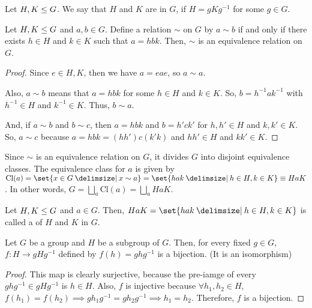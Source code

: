 \documentclass[11pt]{penrose}
\begin{document}
\begin{ndfn}
    Let $H, K \mathrel{\leq} G$. We say that $H$ and $K$ are  in $G$, if $H = g K g^{-1}$ for some $g \in G$.
\end{ndfn}

\begin{nprop}
    Let $H, K \mathrel{\leq} G$ and $a, b \in G$. Define a relation $\sim$ on $G$ by $a \sim b$ if and only if there exists $h \in H$ and $k \in K$ such that $a = hbk$. Then, $\sim$ is an equivalence relation on $G$.
\end{nprop}
\begin{proof}
    Since $e \in H, K$, then we have $a = e a e$, so $a \sim a$.

    Also, $a \sim b$ means that $a = hbk$ for some $h \in H$ and $k \in K$. So, $b = h^{-1} a k^{-1}$ with $h^{-1} \in H$ and $k^{-1} \in K$. Thus, $b \sim a$.

    And, if $a \sim b$ and $b \sim c$, then $a = hbk$ and $b = h'ck'$ for $h, h' \in H$ and $k, k' \in K$. So, $a \sim c$ because $a = h b k = (h h') c (k' k)$ and $hh' \in H$ and $kk' \in K$.
\end{proof}

\begin{remark}
    Since $\sim$ is an equivalence relation on $G$, it divides $G$ into disjoint equivalence classes. The equivalence class for $a$ is given by $\mathrm{Cl}(a) = \set{x \in G \st x \sim a} = \set{hak \st h \in H, k \in K} \equiv HaK$. In other words, $\displaystyle G = \bigsqcup_{a} \mathrm{Cl}(a) = \bigsqcup_{a} HaK$.

\end{remark}

\begin{ndfn}
    Let $H, K \mathrel{\leq} G$ and $a \in G$. Then, $HaK = \set{hak \st h \in H, k \in K}$ is called a  of $H$ and $K$ in $G$.
\end{ndfn}

\begin{nlemma}
    Let $G$ be a group and $H$ be a subgroup of $G$. Then, for every fixed $g \in G$, $f : H \to g H g^{-1}$ defined by $f(h) = ghg^{-1}$ is a bijection. (It is an isomorphism)
\end{nlemma}
\begin{proof}
    This map is clearly surjective, because the pre-iamge of every $ghg^{-1} \in gHg^{-1}$ is $h \in H$. Also, $f$ is injective because $\forall h_{1}, h_{2} \in H$, $f(h_{1}) = f(h_{2}) \implies gh_{1}g^{-1} = gh_{2}g^{-1} \implies h_{1} = h_{2}$. Therefore, $f$ is a bijection.
\end{proof}
\end{document}
